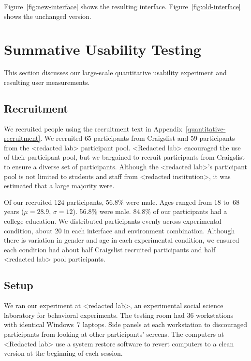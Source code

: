 \documentclass[USenglish,oneside,twocolumn]{article}
\begin{document}
Figure~\ref{fig:new-interface} shows the resulting interface.  Figure~\ref{fig:old-interface} shows the unchanged version. 

\section{Summative Usability Testing}
\label{sec:quantitative}
This section discusses our large-scale quantitative usability experiment and resulting user measurements. 

\subsection{Recruitment}
We recruited  people using the recruitment text in Appendix~\ref{quantitative-recruitment}. We recruited 65 participants from Craigslist and 59 participants from the <redacted lab> participant pool. <Redacted lab> encouraged the use of their participant pool, but we bargained to recruit participants from Craigslist to ensure a diverse set of participants. Although the <redacted lab>'s participant pool is not limited to students and staff from <redacted institution>, it was estimated that a large majority were. 

{\color {red} Of our recruited 124 participants, 56.8\% were male. Ages ranged from 18 to~68 years ($\mu = 28.9$, $\sigma = 12$). 56.8\% were male. 84.8\% of our participants had a college education.} We distributed participants evenly across experimental condition, about 20 in each interface and environment combination. Although there is variation in gender and age in each experimental condition, we ensured each condition had about half Craigslist recruited participants and half <redacted lab>  pool participants. 

\subsection{Setup}
We ran our experiment at <redacted lab>, an experimental social science laboratory for behavioral experiments. The testing room had 36 workstations with identical Windows~7 laptops. Side panels at each workstation to discouraged participants from looking at other participants' screens. 
The computers at <Redacted lab> use a system restore software to revert computers to a clean version at the beginning of each session. 
\end{document}
